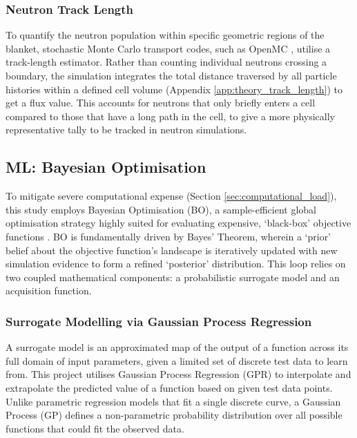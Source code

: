 \documentclass[11pt]{article}
\begin{document}
\subsubsection{Neutron Track Length}
To quantify the neutron population within specific geometric regions of the blanket, stochastic
Monte Carlo transport codes, such as OpenMC \citep{romano_openmc_2015}, utilise a track-length
estimator. Rather than counting individual neutrons crossing a boundary, the simulation integrates
the total distance traversed by all particle histories within a defined cell volume (Appendix
\ref{app:theory_track_length}) to get a flux value. This accounts for neutrons that only briefly
enters a cell compared to those that have a long path in the cell, to give a more physically
representative tally to be tracked in neutron simulations.

\subsection{ML: Bayesian Optimisation}
\label{sec:theory_ml}

To mitigate severe computational expense (Section \ref{sec:computational_load}), this study employs
Bayesian Optimisation (BO), a sample-efficient global optimisation strategy highly suited for
evaluating expensive, `black-box' objective functions \citep{shahriari2015taking}. BO is
fundamentally driven by Bayes' Theorem, wherein a `prior' belief about the objective function's
landscape is iteratively updated with new simulation evidence to form a refined `posterior'
distribution. This loop relies on two coupled mathematical components: a probabilistic surrogate
model and an acquisition function.

\subsubsection{Surrogate Modelling via Gaussian Process Regression}

A surrogate model is an approximated map of the output of a function across its full domain of input
parameters, given a limited set of discrete test data to learn from. This project utilises Gaussian
Process Regression (GPR) \citep{rasmussen2006gaussian} to interpolate and extrapolate the predicted
value of a function based on given test data points. Unlike parametric regression models that fit a
single discrete curve, a Gaussian Process (GP) defines a non-parametric probability distribution
over all possible functions that could fit the observed data.
\end{document}
